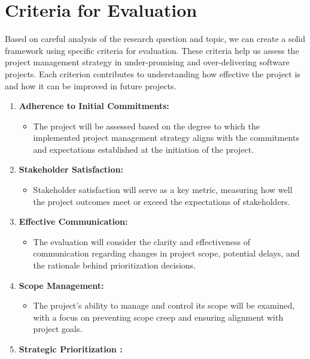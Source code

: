 \documentclass[12pt]{article}
\begin{document}
\section{Criteria for Evaluation}
Based on careful analysis of the research question and topic, we can create a solid framework using specific criteria for evaluation. These criteria help us assess the project management strategy in under-promising and over-delivering software projects. Each criterion contributes to understanding how effective the project is and how it can be improved in future projects.
    \begin{enumerate}
        \item \textbf{Adherence to Initial Commitments:}
                \begin{itemize}
                    \item The project will be assessed based on the degree to which the implemented project management strategy aligns with the commitments and expectations established at the initiation of the project.
                \end{itemize}
        \item \textbf{Stakeholder Satisfaction:}
                \begin{itemize}
                    \item Stakeholder satisfaction will serve as a key metric, measuring how well the project outcomes meet or exceed the expectations of stakeholders.
                \end{itemize}
        \item \textbf{Effective Communication:}
                \begin{itemize}
                    \item The evaluation will consider the clarity and effectiveness of communication regarding changes in project scope, potential delays, and the rationale behind prioritization decisions.
                \end{itemize}
        \item \textbf{Scope Management:}
                \begin{itemize}
                    \item The project's ability to manage and control its scope will be examined, with a focus on preventing scope creep and ensuring alignment with project goals.
                \end{itemize}
        \item \textbf{Strategic Prioritization :}
                \begin{itemize}

\end{itemize}
\end{enumerate}
\end{document}
